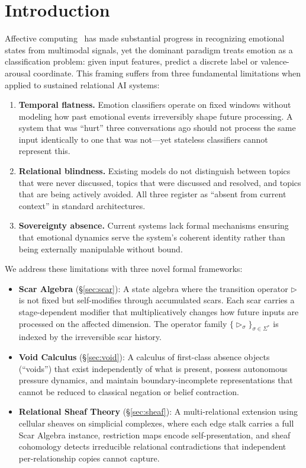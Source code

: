 \documentclass[11pt]{article}
\begin{document}
\section{Introduction}
\label{sec:intro}

Affective computing~\cite{picard1997} has made substantial progress in recognizing emotional states from multimodal signals, yet the dominant paradigm treats emotion as a classification problem: given input features, predict a discrete label or valence-arousal coordinate. This framing suffers from three fundamental limitations when applied to sustained relational AI systems:

\begin{enumerate}[leftmargin=*]
\item \textbf{Temporal flatness.} Emotion classifiers operate on fixed windows without modeling how past emotional events irreversibly shape future processing. A system that was ``hurt'' three conversations ago should not process the same input identically to one that was not---yet stateless classifiers cannot represent this.

\item \textbf{Relational blindness.} Existing models do not distinguish between topics that were never discussed, topics that were discussed and resolved, and topics that are being actively avoided. All three register as ``absent from current context'' in standard architectures.

\item \textbf{Sovereignty absence.} Current systems lack formal mechanisms ensuring that emotional dynamics serve the system's coherent identity rather than being externally manipulable without bound.
\end{enumerate}

We address these limitations with three novel formal frameworks:

\begin{itemize}[leftmargin=*]
\item \textbf{Scar Algebra} (\S\ref{sec:scar}): A state algebra where the transition operator $\triangleright$ is not fixed but self-modifies through accumulated scars. Each scar carries a stage-dependent modifier that multiplicatively changes how future inputs are processed on the affected dimension. The operator family $\{\triangleright_\sigma\}_{\sigma \in \Sigma^*}$ is indexed by the irreversible scar history.

\item \textbf{Void Calculus} (\S\ref{sec:void}): A calculus of first-class absence objects (``voids'') that exist independently of what is present, possess autonomous pressure dynamics, and maintain boundary-incomplete representations that cannot be reduced to classical negation or belief contraction.

\item \textbf{Relational Sheaf Theory} (\S\ref{sec:sheaf}): A multi-relational extension using cellular sheaves on simplicial complexes, where each edge stalk carries a full Scar Algebra instance, restriction maps encode self-presentation, and sheaf cohomology detects irreducible relational contradictions that independent per-relationship copies cannot capture.
\end{itemize}
\end{document}
